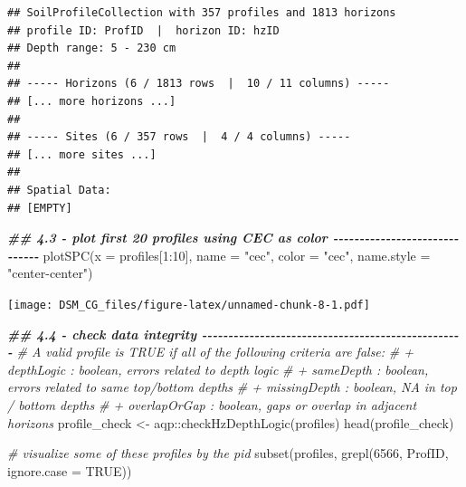 \documentclass[
  10pt,
  b5paper,
  oneside]{book}
\newenvironment{Shaded}{\begin{snugshade}}{\end{snugshade}}
\newcommand{\AttributeTok}[1]{\textcolor[rgb]{0.77,0.63,0.00}{#1}}
\newcommand{\CommentTok}[1]{\textcolor[rgb]{0.56,0.35,0.01}{\textit{#1}}}
\newcommand{\ConstantTok}[1]{\textcolor[rgb]{0.00,0.00,0.00}{#1}}
\newcommand{\DecValTok}[1]{\textcolor[rgb]{0.00,0.00,0.81}{#1}}
\newcommand{\DocumentationTok}[1]{\textcolor[rgb]{0.56,0.35,0.01}{\textbf{\textit{#1}}}}
\newcommand{\FunctionTok}[1]{\textcolor[rgb]{0.00,0.00,0.00}{#1}}
\newcommand{\NormalTok}[1]{#1}
\newcommand{\OtherTok}[1]{\textcolor[rgb]{0.56,0.35,0.01}{#1}}
\newcommand{\SpecialCharTok}[1]{\textcolor[rgb]{0.00,0.00,0.00}{#1}}
\newcommand{\StringTok}[1]{\textcolor[rgb]{0.31,0.60,0.02}{#1}}
\begin{document}
\begin{verbatim}
## SoilProfileCollection with 357 profiles and 1813 horizons
## profile ID: ProfID  |  horizon ID: hzID 
## Depth range: 5 - 230 cm
## 
## ----- Horizons (6 / 1813 rows  |  10 / 11 columns) -----
## [... more horizons ...]
## 
## ----- Sites (6 / 357 rows  |  4 / 4 columns) -----
## [... more sites ...]
## 
## Spatial Data:
## [EMPTY]
\end{verbatim}

\begin{Shaded}
\begin{Highlighting}[]
\DocumentationTok{\#\# 4.3 {-} plot first 20 profiles using CEC as color {-}{-}{-}{-}{-}{-}{-}{-}{-}{-}{-}{-}{-}{-}{-}{-}{-}{-}{-}{-}{-}{-}{-}{-}{-}{-}{-}{-}{-}{-}}
\FunctionTok{plotSPC}\NormalTok{(}\AttributeTok{x =}\NormalTok{ profiles[}\DecValTok{1}\SpecialCharTok{:}\DecValTok{10}\NormalTok{], }\AttributeTok{name =} \StringTok{"cec"}\NormalTok{, }\AttributeTok{color =} \StringTok{"cec"}\NormalTok{,}
        \AttributeTok{name.style =} \StringTok{"center{-}center"}\NormalTok{)}
\end{Highlighting}
\end{Shaded}

\texttt{[image: DSM\_CG\_files/figure-latex/unnamed-chunk-8-1.pdf]}

\begin{Shaded}
\begin{Highlighting}[]
\DocumentationTok{\#\# 4.4 {-} check data integrity {-}{-}{-}{-}{-}{-}{-}{-}{-}{-}{-}{-}{-}{-}{-}{-}{-}{-}{-}{-}{-}{-}{-}{-}{-}{-}{-}{-}{-}{-}{-}{-}{-}{-}{-}{-}{-}{-}{-}{-}{-}{-}{-}{-}{-}{-}{-}{-}{-}{-}}
\CommentTok{\# A valid profile is TRUE if all of the following criteria are false:}
\CommentTok{\#    + depthLogic : boolean, errors related to depth logic}
\CommentTok{\#    + sameDepth : boolean, errors related to same top/bottom depths}
\CommentTok{\#    + missingDepth : boolean, NA in top / bottom depths}
\CommentTok{\#    + overlapOrGap : boolean, gaps or overlap in adjacent horizons}
\NormalTok{profile\_check }\OtherTok{\textless{}{-}}\NormalTok{ aqp}\SpecialCharTok{::}\FunctionTok{checkHzDepthLogic}\NormalTok{(profiles)}
\FunctionTok{head}\NormalTok{(profile\_check)}
\end{Highlighting}
\end{Shaded}

\begin{Shaded}
\begin{Highlighting}[]
\CommentTok{\# visualize some of these profiles by the pid}
\FunctionTok{subset}\NormalTok{(profiles, }\FunctionTok{grepl}\NormalTok{(}\DecValTok{6566}\NormalTok{, ProfID, }\AttributeTok{ignore.case =} \ConstantTok{TRUE}\NormalTok{))}
\end{Highlighting}
\end{Shaded}
\end{document}

